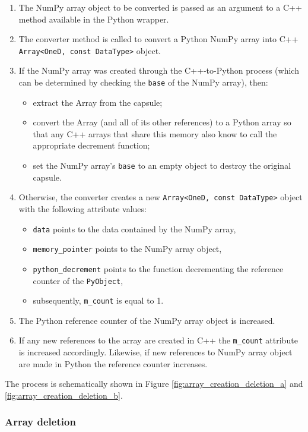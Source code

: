 \begin{enumerate}
  \item The NumPy array object to be converted is passed as an argument to a C++
  method available in the Python wrapper.
  \item The converter method is called to convert a Python NumPy array into C++
  \texttt{Array<OneD, const DataType>} object.
  \item If the NumPy array was created through the C++-to-Python process (which
  can be determined by checking the \texttt{base} of the NumPy array), then:
  \begin{itemize}
    \item extract the \nek{} Array from the capsule;
    \item convert the Array (and all of its other references) to a Python array
    so that any C++ arrays that share this memory also know to call the
    appropriate decrement function;
    \item set the NumPy array's \texttt{base} to an empty object to destroy the
    original capsule.
  \end{itemize}
  \item Otherwise, the converter creates a new \texttt{Array<OneD, const DataType>} object
  with the following attribute values:
  \begin{itemize}
    \item \texttt{data} points to the data contained by the NumPy array,
    \item \texttt{memory\_pointer} points to the NumPy array object,
    \item \texttt{python\_decrement} points to the function decrementing the
    reference counter of the \texttt{PyObject},
    \item subsequently, \texttt{m\_count} is equal to 1.
  \end{itemize}
  \item The Python reference counter of the NumPy array object is increased.
  \item If any new references to the array are created in C++ the
  \texttt{m\_count} attribute is increased accordingly. Likewise, if new
  references to NumPy array object are made in Python the reference counter
  increases.
\end{enumerate}

The process is schematically shown in Figure \ref{fig:array_creation_deletion_a} 
and \ref{fig:array_creation_deletion_b}.

\subsubsection{Array deletion}

